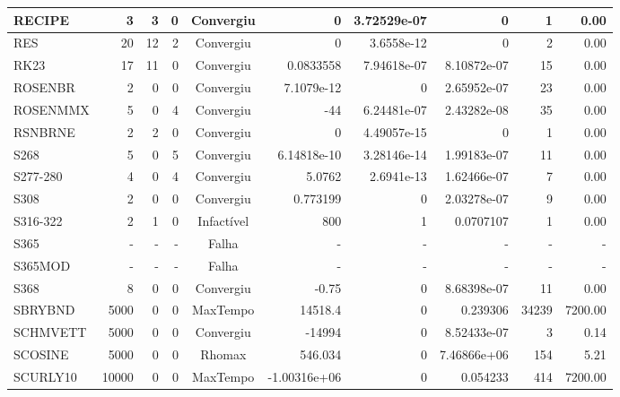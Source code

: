 \begin{center}
\begin{longtable}{|l|r|r|r|c|r|r|r|r|r|}
  RECIPE &      3 &      3 &      0 & Convergiu  &           0 &    3.72529e-07 &           0 &      1 &    0.00 \\ \hline
     RES &     20 &     12 &      2 & Convergiu  &           0 &     3.6558e-12 &           0 &      2 &    0.00 \\ \hline
    RK23 &     17 &     11 &      0 & Convergiu  &   0.0833558 &    7.94618e-07 & 8.10872e-07 &     15 &    0.00 \\ \hline
 ROSENBR &      2 &      0 &      0 & Convergiu  &  7.1079e-12 &              0 & 2.65952e-07 &     23 &    0.00 \\ \hline
ROSENMMX &      5 &      0 &      4 & Convergiu  &         -44 &    6.24481e-07 & 2.43282e-08 &     35 &    0.00 \\ \hline
 RSNBRNE &      2 &      2 &      0 & Convergiu  &           0 &    4.49057e-15 &           0 &      1 &    0.00 \\ \hline
    S268 &      5 &      0 &      5 & Convergiu  & 6.14818e-10 &    3.28146e-14 & 1.99183e-07 &     11 &    0.00 \\ \hline
S277-280 &      4 &      0 &      4 & Convergiu  &      5.0762 &     2.6941e-13 & 1.62466e-07 &      7 &    0.00 \\ \hline
    S308 &      2 &      0 &      0 & Convergiu  &    0.773199 &              0 & 2.03278e-07 &      9 &    0.00 \\ \hline
S316-322 &      2 &      1 &      0 & Infactível &         800 &              1 &   0.0707107 &      1 &    0.00 \\ \hline
S365 & - & - & - & Falha & - & - & - & - & - \\ \hline
S365MOD & - & - & - & Falha & - & - & - & - & - \\ \hline
    S368 &      8 &      0 &      0 & Convergiu  &       -0.75 &              0 & 8.68398e-07 &     11 &    0.00 \\ \hline
 SBRYBND &   5000 &      0 &      0 & MaxTempo   &     14518.4 &              0 &    0.239306 &  34239 & 7200.00 \\ \hline
SCHMVETT &   5000 &      0 &      0 & Convergiu  &      -14994 &              0 & 8.52433e-07 &      3 &    0.14 \\ \hline
 SCOSINE &   5000 &      0 &      0 & Rhomax     &     546.034 &              0 & 7.46866e+06 &    154 &    5.21 \\ \hline
SCURLY10 &  10000 &      0 &      0 & MaxTempo   & -1.00316e+06 &              0 &    0.054233 &    414 & 7200.00 \\ \hline

\end{longtable}
\end{center}
